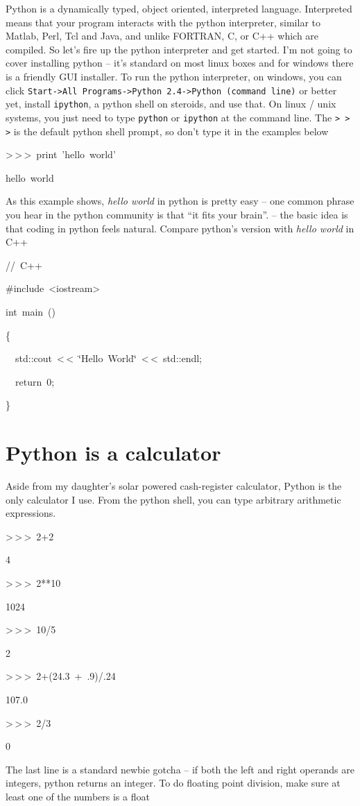Python is a dynamically typed, object oriented, interpreted language.
Interpreted means that your program interacts with the python interpreter,
similar to Matlab, Perl, Tcl and Java, and unlike FORTRAN, C, or C++
which are compiled. So let's fire up the python interpreter and get
started. I'm not going to cover installing python -- it's standard
on most linux boxes and for windows there is a friendly GUI installer.
To run the python interpreter, on windows, you can click \texttt{Start->All
Programs->Python 2.4->Python (command line)} or better yet, install
\texttt{ipython}, a python shell on steroids, and use that. On linux
/ unix systems, you just need to type \texttt{python} or \texttt{ipython}
at the command line. The \texttt{>\,{}>\,{}>} is the default python
shell prompt, so don't type it in the examples below

\begin{lyxcode}
>\,{}>\,{}>~print~'hello~world'

hello~world


\end{lyxcode}
As this example shows, \textit{hello world} in python is pretty easy
-- one common phrase you hear in the python community is that {}``it
fits your brain''. -- the basic idea is that coding in python feels
natural. Compare python's version with \textit{hello world} in C++

\begin{lyxcode}
//~C++

\#include~<iostream>

int~main~()

\{~~~

~~std::cout~<\,{}<~\char`\"{}Hello~World\char`\"{}~<\,{}<~std::endl;

~~return~0;

\}
\end{lyxcode}

\section[Calculator]{\label{sec:into_calculator}Python is a calculator}

Aside from my daughter's solar powered cash-register calculator, Python
is the only calculator I use. From the python shell, you can type
arbitrary arithmetic expressions.

\begin{lyxcode}
>\,{}>\,{}>~2+2

4

>\,{}>\,{}>~2{*}{*}10

1024

>\,{}>\,{}>~10/5

2

>\,{}>\,{}>~2+(24.3~+~.9)/.24

107.0

>\,{}>\,{}>~2/3

0
\end{lyxcode}
The last line is a standard newbie gotcha -- if both the left and
right operands are integers, python returns an integer. To do floating
point division, make sure at least one of the numbers is a float

